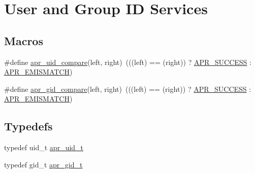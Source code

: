\hypertarget{group__apr__user}{}\section{User and Group ID Services}
\label{group__apr__user}
\subsection*{Macros}
\begin{DoxyCompactItemize}
\item 
\#define \hyperlink{group__apr__user_gafc0e18b67f8e3471848893cc4a052809}{apr\+\_\+uid\+\_\+compare}(left,  right)~(((left) == (right)) ? \hyperlink{group__apr__errno_ga9ee311b7bf1c691dc521d721339ee2a6}{A\+P\+R\+\_\+\+S\+U\+C\+C\+E\+SS} \+: \hyperlink{group___a_p_r___error_ga31e65a44daba96aa6d943529e94498e7}{A\+P\+R\+\_\+\+E\+M\+I\+S\+M\+A\+T\+CH})
\item 
\#define \hyperlink{group__apr__user_gaa87aee2f533bed9dac33613fcf398713}{apr\+\_\+gid\+\_\+compare}(left,  right)~(((left) == (right)) ? \hyperlink{group__apr__errno_ga9ee311b7bf1c691dc521d721339ee2a6}{A\+P\+R\+\_\+\+S\+U\+C\+C\+E\+SS} \+: \hyperlink{group___a_p_r___error_ga31e65a44daba96aa6d943529e94498e7}{A\+P\+R\+\_\+\+E\+M\+I\+S\+M\+A\+T\+CH})
\end{DoxyCompactItemize}
\subsection*{Typedefs}
\begin{DoxyCompactItemize}
\item 
typedef uid\+\_\+t \hyperlink{group__apr__user_gad1aa508f584bc230acf4f68ba4fc4de7}{apr\+\_\+uid\+\_\+t}
\item 
typedef gid\+\_\+t \hyperlink{group__apr__user_ga22e9e224e984f837f3e276833e2f3a55}{apr\+\_\+gid\+\_\+t}
\end{DoxyCompactItemize}
